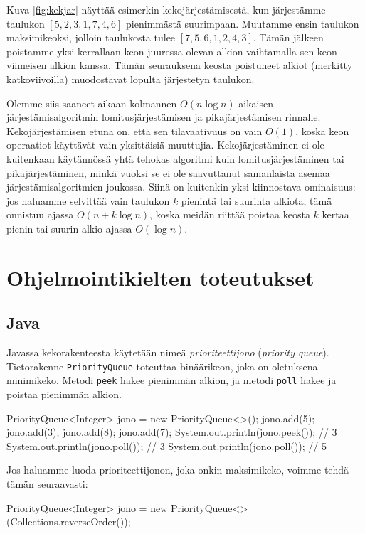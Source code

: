 Kuva \ref{fig:kekjar} näyttää esimerkin kekojärjestämisestä,
kun järjestämme taulukon $[5,2,3,1,7,4,6]$
pienimmästä suurimpaan.
Muutamme ensin taulukon maksimikeoksi,
jolloin taulukosta tulee $[7,5,6,1,2,4,3]$.
Tämän jälkeen poistamme yksi kerrallaan
keon juuressa olevan alkion vaihtamalla sen
keon viimeisen alkion kanssa.
Tämän seurauksena keosta poistuneet alkiot
(merkitty katkoviivoilla) muodostavat lopulta järjestetyn taulukon.

Olemme siis saaneet aikaan kolmannen $O(n \log n)$-aikaisen
järjestämis\-algoritmin lomitusjärjestämisen ja pikajärjestämisen rinnalle.
Kekojärjestä\-misen etuna on, että sen tilavaativuus on vain $O(1)$,
koska keon operaatiot käyttävät vain yksittäisiä muuttujia.
Kekojärjestäminen ei ole kuitenkaan käytännössä yhtä tehokas algoritmi
kuin lomitusjärjestäminen tai pikajärjestäminen,
minkä vuoksi se ei ole saavuttanut samanlaista asemaa
järjestämisalgoritmien joukossa.
Siinä on kuitenkin yksi kiinnostava ominaisuus:
jos haluamme selvittää vain taulukon $k$ pienintä tai suurinta
alkiota, tämä onnistuu ajassa $O(n+k \log n)$,
koska meidän riittää poistaa keosta $k$ kertaa
pienin tai suurin alkio ajassa $O(\log n)$.

\section{Ohjelmointikielten toteutukset}

\subsection{Java}


Javassa kekorakenteesta käytetään nimeä \emph{prioriteettijono} (\emph{priority queue}).
Tietorakenne \texttt{PriorityQueue}
toteuttaa binäärikeon, joka on oletuksena minimikeko.
Metodi \texttt{peek} hakee pienimmän alkion, ja
metodi \texttt{poll} hakee ja poistaa pienimmän alkion.

\begin{code}
PriorityQueue<Integer> jono = new PriorityQueue<>();
jono.add(5);
jono.add(3);
jono.add(8);
jono.add(7);
System.out.println(jono.peek()); // 3
System.out.println(jono.poll()); // 3
System.out.println(jono.poll()); // 5
\end{code}

Jos haluamme luoda prioriteettijonon, joka onkin
maksimikeko, voimme tehdä tämän seuraavasti:

\begin{code}
PriorityQueue<Integer> jono =
    new PriorityQueue<>(Collections.reverseOrder());
\end{code}

